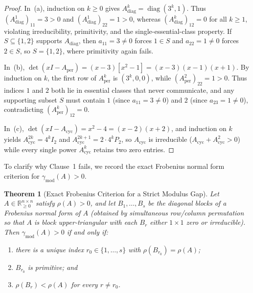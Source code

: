 \documentclass[11pt]{article}
\newtheorem{theorem}{Theorem}[section]
\theoremstyle{definition}
\newcommand{\R}{\mathbb{R}}
\DeclareMathOperator{\diag}{diag}
\begin{document}
\begin{proof}
In~(a), induction on $k \ge 0$ gives $A_{\mathrm{diag}}^k = \diag(3^k, 1)$. Thus $(A_{\mathrm{diag}}^1)_{11} = 3 > 0$ and $(A_{\mathrm{diag}}^1)_{22} = 1 > 0$, whereas $(A_{\mathrm{diag}}^k)_{12} = 0$ for all $k \ge 1$, violating irreducibility, primitivity, and the single-essential-class property. If $S \subseteq \{1, 2\}$ supports $A_{\mathrm{diag}}$, then $a_{11} = 3 \neq 0$ forces $1 \in S$ and $a_{22} = 1 \neq 0$ forces $2 \in S$, so $S = \{1, 2\}$, where primitivity again fails.

In~(b), $\det(x I - A_{\mathrm{per}}) = (x - 3)[x^2 - 1] = (x - 3)(x - 1)(x + 1)$. By induction on $k$, the first row of $A_{\mathrm{per}}^k$ is $(3^k, 0, 0)$, while $(A_{\mathrm{per}}^2)_{22} = 1 > 0$. Thus indices $1$ and $2$ both lie in essential classes that never communicate, and any supporting subset $S$ must contain $1$ (since $a_{11} = 3 \neq 0$) and $2$ (since $a_{23} = 1 \neq 0$), contradicting $(A_{\mathrm{per}}^k)_{12} = 0$.

In~(c), $\det(x I - A_{\mathrm{cyc}}) = x^2 - 4 = (x - 2)(x + 2)$, and induction on $k$ yields $A_{\mathrm{cyc}}^{2k} = 4^k I_2$ and $A_{\mathrm{cyc}}^{2k+1} = 2 \cdot 4^k P_2$, so $A_{\mathrm{cyc}}$ is irreducible ($A_{\mathrm{cyc}} + A_{\mathrm{cyc}}^2 > 0$) while every single power $A_{\mathrm{cyc}}^k$ retains two zero entries.
\end{proof}

To clarify why Clause~1 fails, we record the exact Frobenius normal form criterion for $\gamma_{\mathrm{mod}}(A) > 0$.

\begin{theorem}[Exact Frobenius Criterion for a Strict Modulus Gap]\label{thm:frobenius-criterion}
Let $A \in \R^{n \times n}_{\ge 0}$ satisfy $\rho(A) > 0$, and let $B_1, \dots, B_s$ be the diagonal blocks of a Frobenius normal form of $A$ (obtained by simultaneous row/column permutation so that $A$ is block upper-triangular with each $B_r$ either $1 \times 1$ zero or irreducible). Then $\gamma_{\mathrm{mod}}(A) > 0$ if and only if:
\begin{enumerate}
  \item[(i)] there is a unique index $r_0 \in \{1, \dots, s\}$ with $\rho(B_{r_0}) = \rho(A)$;
  \item[(ii)] $B_{r_0}$ is primitive; and
  \item[(iii)] $\rho(B_r) < \rho(A)$ for every $r \neq r_0$.
\end{enumerate}
\end{theorem}
\end{document}
